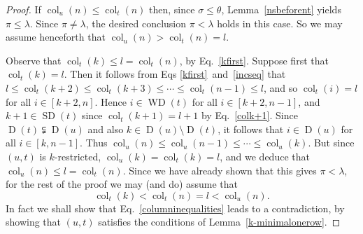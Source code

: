 \documentclass[10pt]{amsart}
\theoremstyle{definition}
\DeclareMathOperator{\col}{col}
\DeclareMathOperator{\SD}{SD}
\DeclareMathOperator{\WD}{WD}
\DeclareMathOperator{\D}{D}
\begin{document}
\begin{proof}
If $\col_u(n)\leqslant\col_t(n)$ then, since $\sigma\leqslant \theta$,
Lemma~\ref{nsbeforent} yields $\pi\leqslant\lambda$. Since
$\pi\neq\lambda$, the desired conclusion $\pi<\lambda$ holds in this case.
So we may assume henceforth that $\col_u(n)>\col_t(n)=l$.

Observe that $\col_t(k)\leqslant l=\col_t(n)$, by Eq.~\eqref{kfirst}. Suppose
first that $\col_t(k)=l$. Then it follows from Eqs \eqref{kfirst}~and~\eqref{incseq} that
$l\leqslant\col_t(k+2)\leqslant\col_t(k+3)\leqslant\cdots\leqslant\col_t(n-1)\leqslant l$,
and so $\col_t(i)=l$ for all $i\in[k+2,n]$. Hence $i\in\WD(t)$ for all $i\in[k+2,n-1]$,
and $k+1\in\SD(t)$ since $\col_t(k+1)=l+1$ by Eq.~\eqref{colk+1}.
Since $\D(t)\subsetneqq\D(u)$ and also $k\in\D(u)\setminus\D(t)$, it follows that
$i\in\D(u)$ for all $i\in[k,n-1]$. Thus
$\col_u(n)\leqslant\col_u(n-1)\leqslant\cdots\leqslant\col_u(k)$. But
since $(u,t)$ is $k$-restricted, $\col_u(k)=\col_t(k)=l$, and
we deduce that $\col_u(n)\leqslant l=\col_t(n)$. Since we have already shown that
this gives $\pi<\lambda$, for the rest of the proof we may (and do) assume that
\begin{equation}\label{columninequalities}
\col_t(k)<\col_t(n)=l<\col_u(n).
\end{equation}
In fact we shall show that Eq.~\eqref{columninequalities} leads to a contradiction,
by showing that $(u,t)$ satisfies the conditions of Lemma~\ref{k-minimalonerow}.


\end{proof}
\end{document}
